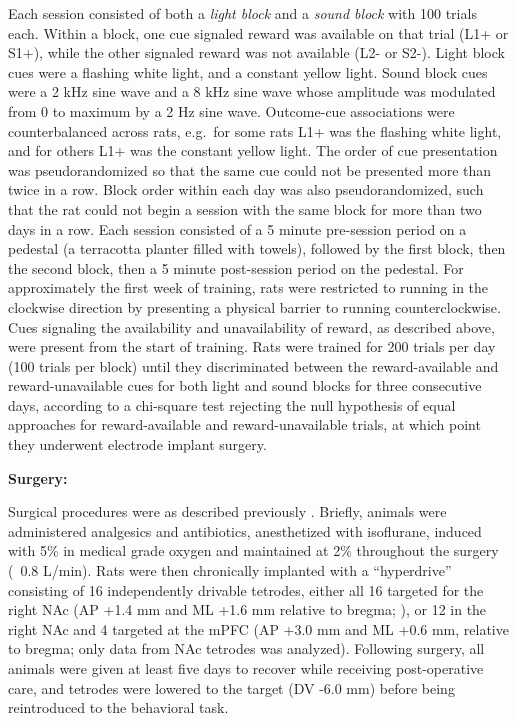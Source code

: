 \documentclass[11pt]{article}
\let\cite=\citep
\let\citeNP=\citealt
\begin{document}
Each session consisted of both a {\it light block} and a {\it sound block} with
100 trials each. Within a block, one cue signaled reward was available on that
trial (L1+ or S1+), while the other signaled reward was not available (L2- or
S2-). Light block cues were a flashing white light, and a constant yellow
light. Sound block cues were a 2 kHz sine wave and a 8 kHz sine wave whose
amplitude was modulated from 0 to maximum by a 2 Hz sine wave. Outcome-cue
associations were counterbalanced across rats, e.g.\ for some rats L1+ was the
flashing white light, and for others L1+ was the constant yellow light. The
order of cue presentation was pseudorandomized so that the same cue could not be
presented more than twice in a row. Block order within each day was also
pseudorandomized, such that the rat could not begin a session with the same
block for more than two days in a row. Each session consisted of a 5 minute
pre-session period on a pedestal (a terracotta planter filled with towels),
followed by the first block, then the second block, then a 5 minute post-session
period on the pedestal. For approximately the first week of training, rats were restricted to
running in the clockwise direction by presenting a physical barrier to
running counterclockwise. Cues signaling the availability and
unavailability of reward, as described above, were present from the
start of training. Rats were trained for 200 trials per day (100
trials per block) until they discriminated between the reward-available and reward-unavailable cues for both light and
sound blocks for three consecutive days, according to a chi-square test
rejecting the null hypothesis of equal approaches for reward-available and
reward-unavailable trials, at which point they underwent electrode implant
surgery.

{\bf Surgery:}

Surgical procedures were as described previously
\cite{Malhotra2015}. Briefly, animals were administered analgesics and
antibiotics, anesthetized with isoflurane, induced with 5\% in medical
grade oxygen and maintained at 2\% throughout the surgery (~0.8
L/min). Rats were then chronically implanted with a ``hyperdrive''
consisting of 16 independently drivable tetrodes, either all 16
targeted for the right NAc (AP +1.4 mm and ML +1.6 mm relative to
bregma; \citeNP{atlas}), or 12 in the right NAc and 4 targeted at the
mPFC (AP +3.0 mm and ML +0.6 mm, relative to bregma; only data from
NAc tetrodes was analyzed). Following surgery, all animals were given
at least five days to recover while receiving post-operative care, and
tetrodes were lowered to the target (DV -6.0 mm) before being
reintroduced to the behavioral task.
\end{document}
